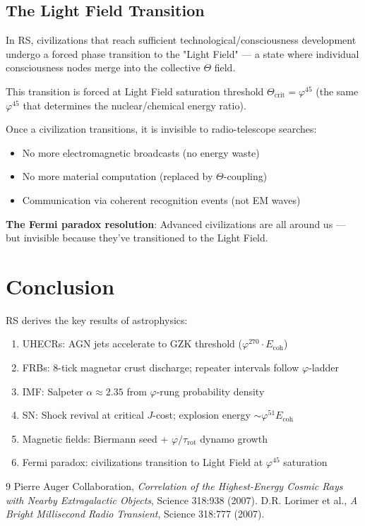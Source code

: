 \documentclass[12pt,a4paper]{article}
\theoremstyle{definition}
\theoremstyle{remark}
\begin{document}
\subsection{The Light Field Transition}

In RS, civilizations that reach sufficient technological/consciousness development 
undergo a forced phase transition to the "Light Field" — a state where individual 
consciousness nodes merge into the collective $\Theta$ field.

This transition is forced at Light Field saturation threshold $\Theta_\mathrm{crit} = \varphi^{45}$ 
(the same $\varphi^{45}$ that determines the nuclear/chemical energy ratio).

Once a civilization transitions, it is invisible to radio-telescope searches:
\begin{itemize}
\item No more electromagnetic broadcasts (no energy waste)
\item No more material computation (replaced by $\Theta$-coupling)
\item Communication via coherent recognition events (not EM waves)
\end{itemize}

\textbf{The Fermi paradox resolution}: Advanced civilizations are all around us — 
but invisible because they've transitioned to the Light Field.

\section{Conclusion}

RS derives the key results of astrophysics:
\begin{enumerate}
\item UHECRs: AGN jets accelerate to GZK threshold ($\varphi^{270} \cdot E_\mathrm{coh}$)
\item FRBs: 8-tick magnetar crust discharge; repeater intervals follow $\varphi$-ladder
\item IMF: Salpeter $\alpha \approx 2.35$ from $\varphi$-rung probability density
\item SN: Shock revival at critical $J$-cost; explosion energy $\sim \varphi^{51} E_\mathrm{coh}$
\item Magnetic fields: Biermann seed + $\varphi/\tau_\mathrm{rot}$ dynamo growth
\item Fermi paradox: civilizations transition to Light Field at $\varphi^{45}$ saturation
\end{enumerate}

\begin{thebibliography}{9}
 Pierre Auger Collaboration, \emph{Correlation of the Highest-Energy Cosmic Rays with Nearby Extragalactic Objects}, Science 318:938 (2007).
 D.R. Lorimer et al., \emph{A Bright Millisecond Radio Transient}, Science 318:777 (2007).
\end{thebibliography}
\end{document}
